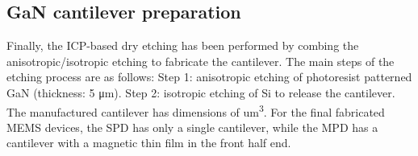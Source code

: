 \subsection{GaN cantilever preparation}

Finally, the  ICP-based  dry  etching has been performed by combing the  anisotropic/isotropic etching  to fabricate the  cantilever. The main steps of the etching process are as follows: Step 1: anisotropic etching of photoresist patterned GaN (thickness: 5 \unit{\um}). Step 2: isotropic etching of Si to release the cantilever. The manufactured cantilever has dimensions of  \unit{um^3}. For the final fabricated  MEMS devices, the SPD has only a single cantilever, while the MPD has a cantilever with a magnetic thin film in the front half end.
	
